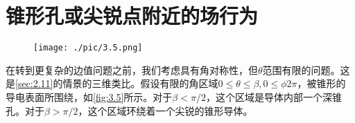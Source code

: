 \documentclass[12pt]{book}
\numberwithin{equation}{chapter}
\numberwithin{figure}{chapter}
\numberwithin{footnote}{page}
\begin{document}
\section{锥形孔或尖锐点附近的场行为}\label{sec:3.4}

\begin{figure}[!ht]
    \centering
    \texttt{[image: ./pic/3.5.png]}
    \captionsetup{justification=raggedright, singlelinecheck=false}
    \caption{}
    \label{fig:3.5}
\end{figure}

在转到更复杂的边值问题之前，我们考虑具有角对称性，但$\theta$范围有限的问题。这是\autoref{sec:2.11}的情景的三维类比。假设有限的角区域$0\leq \theta\leq\beta,0\leq\phi 2\pi$，被锥形的导电表面所围绕，如\autoref{fig:3.5}所示。对于$\beta<\pi/2$，这个区域是导体内部一个深锥孔。对于$\beta>\pi/2$，这个区域环绕着一个尖锐的锥形导体。
\end{document}
